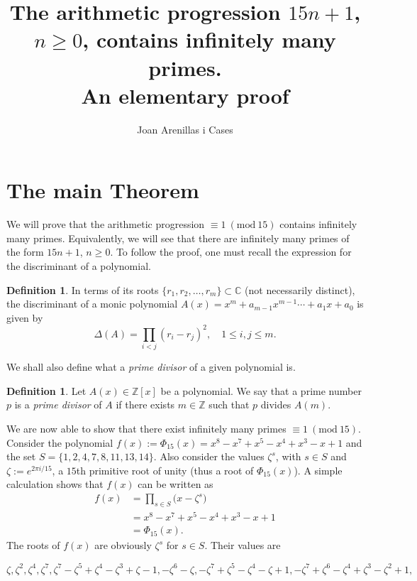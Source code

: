 \documentclass[a4paper, 12pt]{article}
\title{\textbf{The arithmetic progression $15n+1$, $n\geqslant0$, contains infinitely many primes.\\ An elementary proof}}
\date{\vspace{-5ex}}
\author[1]{Joan Arenillas i Cases}
\theoremstyle{definition}
\newtheorem{definition}[theorem]{Definition}
\theoremstyle{remark}
\newcommand{\Z}{\ensuremath{\mathbb{Z}}}
\newcommand{\C}{\ensuremath{\mathbb{C}}}
\newcommand{\Mod}[1]{\ (\mathrm{mod}\ #1)} %
\begin{document}
\maketitle
\sloppy

\section{The main Theorem}

We will prove that the arithmetic progression $\equiv 1 \Mod{15}$ contains infinitely many primes. Equivalently, we will see that there are infinitely many primes of the form $15n+1$, $n\geqslant0$. To follow the proof, one must recall the expression for the discriminant of a polynomial. \begin{definition}
In terms of its roots $\{r_1,r_2,\dots,r_m\}\subset\C$ (not necessarily distinct), the discriminant of a monic polynomial $A(x)=x^m+a_{m-1}x^{m-1}\cdots+a_1x+a_0$ is given by
\begin{equation}\label{eq:discrim}
	\Delta(A)=\prod_{i<j}(r_i-r_j)^2, \quad 1\leqslant i,j\leqslant m.
\end{equation}
\end{definition}

We shall also define what a \emph{prime divisor} of a given polynomial is.

\begin{definition}
Let $A(x)\in\Z[x]$ be a polynomial. We say that a prime number $p$ is a \emph{prime divisor} of $A$ if there exists $m\in\Z$ such that $p$ divides $A(m)$.
\end{definition}

We are now able to show that there exist infinitely many primes $\equiv 1\Mod{15}$. Consider the polynomial $f(x):=\Phi_{15}(x)=x^{8} - x^{7} + x^{5} - x^{4} + x^{3} - x + 1$ and the set $S=\{1, 2, 4, 7, 8, 11, 13, 14\}$. Also consider the values $\zeta^{s}$, with $s\in S$ and $\zeta:=e^{2\pi i/{15}}$, a $15$th primitive root of unity (thus a root of $\Phi_{15}(x)$). A simple calculation shows that $f(x)$ can be written as
\begin{align*}
f(x)&=\prod_{s\in S}\big(x-\zeta^{s}\big)\\
&=x^{8} - x^{7} + x^{5} - x^{4} + x^{3} - x + 1\\
&=\Phi_{15}(x).
\end{align*}
The roots of $f(x)$ are obviously $\zeta^{s}$ for $s \in S$. Their values are 

$$ζ, ζ^{2}, ζ^{4}, ζ^{7}, ζ^{7} - ζ^{5} + ζ^{4} - ζ^{3} + ζ - 1, -ζ^{6} - ζ, -ζ^{7} + ζ^{5} - ζ^{4} - ζ + 1, -ζ^{7} + ζ^{6} - ζ^{4} + ζ^{3} - ζ^{2} + 1,$$ 
\end{document}
